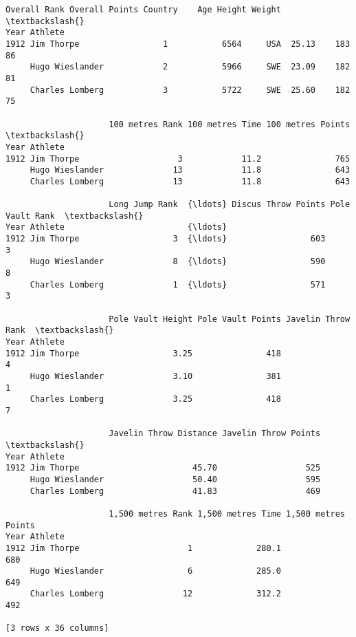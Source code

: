 \documentclass[11pt]{article}
\begin{document}
    
    \begin{Verbatim}[commandchars=\\\{\}]
                     Overall Rank Overall Points Country    Age Height Weight  \textbackslash{}
Year Athlete                                                                    
1912 Jim Thorpe                 1           6564     USA  25.13    183     86   
     Hugo Wieslander            2           5966     SWE  23.09    182     81   
     Charles Lomberg            3           5722     SWE  25.60    182     75   

                     100 metres Rank 100 metres Time 100 metres Points  \textbackslash{}
Year Athlete                                                             
1912 Jim Thorpe                    3            11.2               765   
     Hugo Wieslander              13            11.8               643   
     Charles Lomberg              13            11.8               643   

                     Long Jump Rank  {\ldots} Discus Throw Points Pole Vault Rank  \textbackslash{}
Year Athlete                         {\ldots}                                       
1912 Jim Thorpe                   3  {\ldots}                 603               3   
     Hugo Wieslander              8  {\ldots}                 590               8   
     Charles Lomberg              1  {\ldots}                 571               3   

                     Pole Vault Height Pole Vault Points Javelin Throw Rank  \textbackslash{}
Year Athlete                                                                  
1912 Jim Thorpe                   3.25               418                  4   
     Hugo Wieslander              3.10               381                  1   
     Charles Lomberg              3.25               418                  7   

                     Javelin Throw Distance Javelin Throw Points  \textbackslash{}
Year Athlete                                                       
1912 Jim Thorpe                       45.70                  525   
     Hugo Wieslander                  50.40                  595   
     Charles Lomberg                  41.83                  469   

                     1,500 metres Rank 1,500 metres Time 1,500 metres Points  
Year Athlete                                                                  
1912 Jim Thorpe                      1             280.1                 680  
     Hugo Wieslander                 6             285.0                 649  
     Charles Lomberg                12             312.2                 492  

[3 rows x 36 columns]
    \end{Verbatim}
\end{document}

